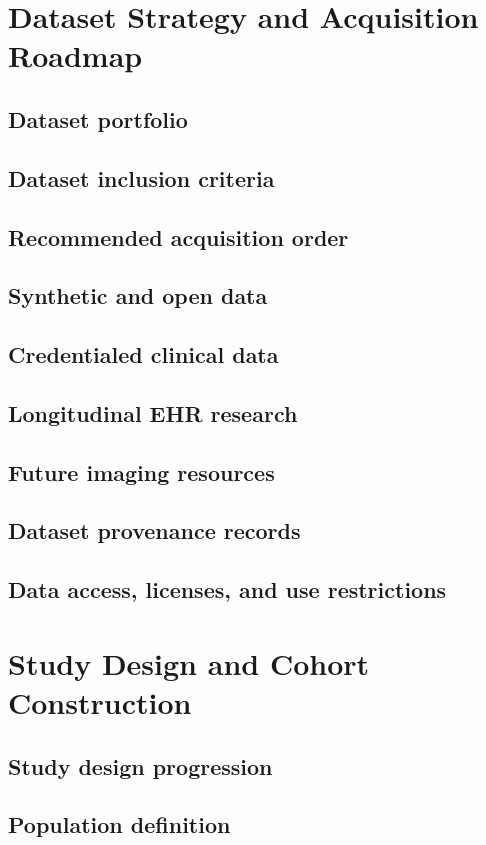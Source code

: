 \documentclass[11pt,journal,onecolumn,draftclsnofoot]{IEEEtran}
\begin{document}
\section{Dataset Strategy and Acquisition Roadmap}
\subsection{Dataset portfolio}
\subsection{Dataset inclusion criteria}
\subsection{Recommended acquisition order}
\subsection{Synthetic and open data}
\subsection{Credentialed clinical data}
\subsection{Longitudinal EHR research}
\subsection{Future imaging resources}
\subsection{Dataset provenance records}
\subsection{Data access, licenses, and use restrictions}

\section{Study Design and Cohort Construction}
\subsection{Study design progression}
\subsection{Population definition}
\end{document}
